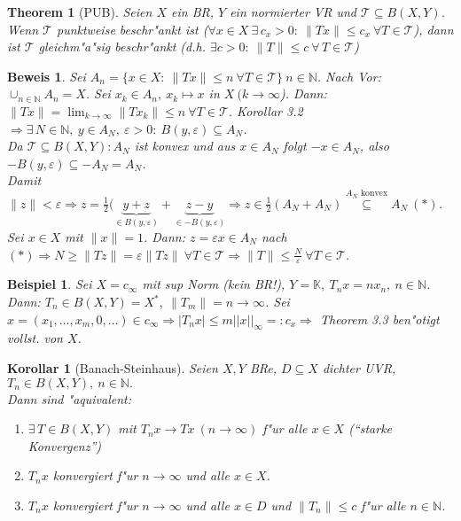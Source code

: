 \documentclass[a4paper,11pt]{book}
\newcommand{\N}{{\mathbb N}}
\newcommand{\K}{{\mathbb K}}
\newcommand{\sn}[1]{||#1||_{\infty}}
\newcommand{\eps}{{\varepsilon}}
\def\TT{ \mathcal{T} }
\newtheorem{Kor}[Def]{Korollar}
\newtheorem{Theo}[Def]{Theorem}
\newtheorem{Bsp}[Def]{Beispiel}
\theoremstyle{nonumberplain}
\newtheorem{Bew}{Beweis}
\begin{document}
\begin{Theo}[PUB]
Seien $X$ ein BR, $Y$ ein normierter VR und $\TT \subseteq B(X,Y)$. Wenn $\TT$ punktweise beschr"ankt ist ($\forall x \in X \ \exists\, c_x > 0:\ \|Tx\| \leq c_x\ \forall T \in \TT$), dann ist $\TT$ gleichm"a"sig beschr"ankt (d.h. $\exists c > 0:\ \|T\| \leq c \ \forall\, T \in \TT$)
\end{Theo}


\begin{Bew}
Sei $A_n = \{ x \in X:\ \|Tx\| \leq n \ \forall T \in \TT\}\ n \in \N$. Nach Vor: $\cup_{n \in \N} A_n = X$. Sei $x_k \in A_n,\ x_k \mapsto x$ in $X\ (k \rightarrow \infty$). Dann: $\|Tx\| = \lim_{k \rightarrow \infty} \|Tx_k\| \leq n\ \forall T \in \TT$. Korollar 3.2 $\Rightarrow \exists\, N \in \N,\ y \in A_N,\ \eps > 0:\ B(y,\eps) \subseteq A_N$.\\
Da $\TT \subseteq B(X,Y): A_N$ ist konvex und aus $x \in A_N$ folgt $-x \in A_N$, also $-B(y,\eps) \subseteq -A_N = A_N$.\\
Damit $\|z\| < \eps \Rightarrow z = \frac12 (\underbrace{y+z}_{\in B(y,\eps)} + \underbrace{z-y}_{\in - B(y,\eps)} \Rightarrow z \in \frac12 (A_N + A_N) \stackrel{A_N \text{ konvex}}{\subseteq} A_N \ (\ast)$.\\
Sei $x \in X$ mit $\|x\| = 1$. Dann: $z = \eps x \in A_N$ nach $(\ast) \Rightarrow N \geq \|Tz\| = \eps \|Tz\|\ \forall T \in \TT \Rightarrow \|T\| \leq \frac{N}{\eps}\ \forall T \in \TT$.
\end{Bew}


\begin{Bsp}
Sei $X = c_{\infty}$ mit sup Norm (kein BR!), $Y = \K,\ T_nx = nx_n,\ n \in \N$.\\
Dann: $T_n \in B(X,Y) = X^{\ast},\ \|T_m\| = n \rightarrow \infty$. Sei $x = (x_1,\dots,x_m,0,\dots) \in c_{\infty} \Rightarrow |T_n x| \leq m \sn{x} =: c_x \Rightarrow$ Theorem 3.3 ben"otigt vollst. von $X$.
\end{Bsp}


\begin{Kor}[Banach-Steinhaus]
Seien $X,Y$ BRe, $D \subseteq X$ dichter UVR, $T_n \in B(X,Y),\ n \in \N.$\\
Dann sind "aquivalent:
\begin{enumerate}
\item $\exists\, T \in B(X,Y)$ mit $T_nx \rightarrow Tx\ (n \rightarrow \infty)$ f"ur alle $x \in X$ (``starke Konvergenz'')

\item $T_nx$ konvergiert f"ur $n \rightarrow \infty$ und alle $x \in X$.

\item $T_nx$ konvergiert f"ur $n \rightarrow \infty$ und alle $x \in D$ und $\|T_n\| \leq c$ f"ur alle $n \in \N$.
\end{enumerate}
\end{Kor}
\end{document}
